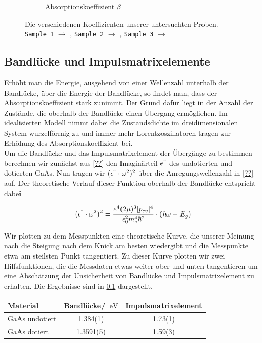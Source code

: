 \documentclass[paper=a4,fontsize=10pt,DIV=18,twocolumn,parskip=half]{scrartcl}
\numberwithin{equation}{section}    %
\begin{document}
\begin{figure}
\begin{subfigure}{\columnwidth}
        \caption{Absorptionskoeffizient $\beta$}
        \label{ab}
    \end{subfigure}
    \caption{Die verschiedenen Koeffizienten unserer untersuchten Proben.  
    \texttt{Sample 1} $\rightarrow$ ,
    \texttt{Sample 2} $\rightarrow$ , 
    \texttt{Sample 3} $\rightarrow$ }
    \label{brechzahlen}
\end{figure}

\subsection{Bandlücke und Impulsmatrixelemente}

Erhöht man die Energie, ausgehend von einer Wellenzahl unterhalb der Bandlücke, über die Energie der Bandlücke, so findet man, dass der Absorptionskoeffizient stark zunimmt. Der Grund dafür liegt in der Anzahl der Zustände, die oberhalb der Bandlücke einen Übergang ermöglichen. Im idealisierten Modell nimmt dabei die Zustandsdichte im dreidimensionalen System wurzelförmig zu und immer mehr Lorentzoszillatoren tragen zur Erhöhung des Absorptionskoeffizient bei.\\
Um die Bandlücke und das Impulsmatrixelement der Übergänge zu bestimmen berechnen wir zunächst aus \cref{??} den Imaginärteil $\epsilon^{``}$ des undotierten und dotierten GaAs. Nun tragen wir $(\epsilon^{``}\cdot \omega^2)^2$ über die Anregungswellenzahl in \cref{??} auf. Der theoretische Verlauf dieser Funktion oberhalb der Bandlücke entspricht dabei

\begin{align}
   (\epsilon^{``}\cdot \omega^2)^2=\frac{e^4 (2\mu)^3 |p_{cv}|^4}{\epsilon_0^2 m_e^4 \hbar^2} \cdot (\hbar \omega - E_g)
\end{align}

Wir plotten zu dem Messpunkten eine theoretische Kurve, die unserer Meinung nach die Steigung nach dem Knick am besten wiedergibt und die Messpunkte etwa am steilsten Punkt tangentiert. Zu dieser Kurve plotten wir zwei Hilfsfunktionen, die die Messdaten etwas weiter ober und unten tangentieren um eine Abschätzung der Unsicherheit von Bandlücke und Impulsmatrixelement zu erhalten.
Die Ergebnisse sind in \cref{} dargestellt.

\begin{tabular}{ l | c c }
  Material & Bandlücke/ $\SI{}{\eV}$ & Impulsmatrixelement\\
  \hline
  GaAs undotiert & 1.384(1) & 1.73(1) \\
  GaAs dotiert & 1.3591(5) & 1.59(3) \\
\end{tabular}
\end{document}
